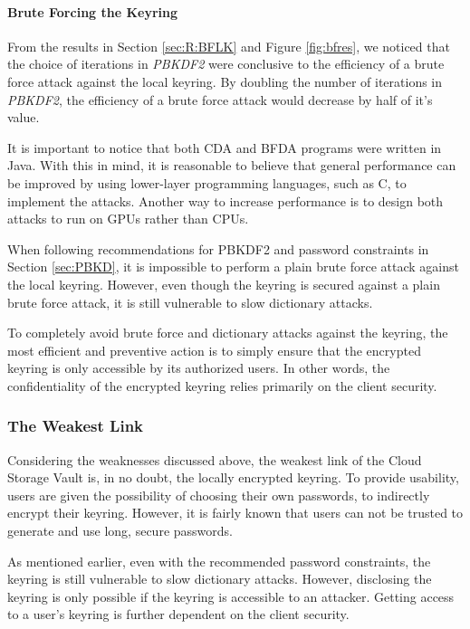 \documentclass[pdftex,english,10pt,b5paper,twoside]{book}
\begin{document}
\paragraph{Brute Forcing the Keyring}
From the results in Section \ref{sec:R:BFLK} and Figure \ref{fig:bfres}, we noticed
that the choice of iterations in \emph{PBKDF2} were conclusive to the efficiency of a
brute force attack against the local keyring. By doubling the number of
iterations in \emph{PBKDF2}, the efficiency of a brute force attack would decrease by
half of it's value.

It is important to notice that both CDA and \ac{BFDA} programs were
written in Java. With this in mind, it is reasonable to believe
that general performance can be improved by using lower-layer
programming languages, such as C, to implement the attacks. Another way to
increase performance is to design both attacks to run on \ac{GPU}s rather than CPUs.

When following recommendations for \ac{PBKDF2} and password constraints in
Section \ref{sec:PBKD}, it is impossible to perform a plain brute force attack
against the local keyring. However, even though the keyring is secured against a plain
brute force attack, it is still vulnerable to slow dictionary attacks.

To completely avoid brute force and dictionary attacks against the keyring, the
most efficient and preventive action is to simply ensure that the encrypted keyring is
only accessible by its authorized users. In other words, the confidentiality of
the encrypted keyring relies primarily on the client security.

\subsubsection{The Weakest Link}
Considering the weaknesses discussed above, the weakest link of the Cloud
Storage Vault is, in no doubt, the locally encrypted keyring. To provide
usability, users are given the possibility of choosing their own passwords, to
indirectly encrypt their keyring. However, it is fairly known that users can not
be trusted to generate and use long, secure passwords. 

As mentioned earlier, even with the recommended password constraints, the
keyring is still vulnerable to slow dictionary attacks. However, disclosing the
keyring is only possible if the keyring is accessible to an attacker. Getting access to a
user's keyring is further dependent on the client security.
\end{document}
